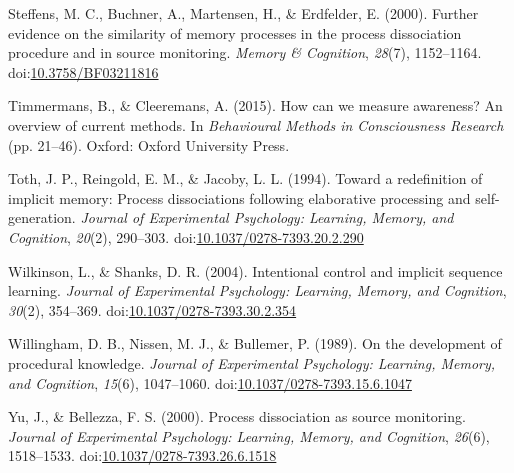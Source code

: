 \documentclass[man]{apa6}
\theoremstyle{definition}
\theoremstyle{definition}
\theoremstyle{definition}
\theoremstyle{remark}
\begin{document}
\hypertarget{ref-steffens_further_2000}{}
Steffens, M. C., Buchner, A., Martensen, H., \& Erdfelder, E. (2000).
Further evidence on the similarity of memory processes in the process
dissociation procedure and in source monitoring. \emph{Memory \&
Cognition}, \emph{28}(7), 1152--1164.
doi:\href{https://doi.org/10.3758/BF03211816}{10.3758/BF03211816}

\hypertarget{ref-timmermans_how_2015}{}
Timmermans, B., \& Cleeremans, A. (2015). How can we measure awareness?
An overview of current methods. In \emph{Behavioural Methods in
Consciousness Research} (pp. 21--46). Oxford: Oxford University Press.

\hypertarget{ref-toth_toward_1994}{}
Toth, J. P., Reingold, E. M., \& Jacoby, L. L. (1994). Toward a
redefinition of implicit memory: Process dissociations following
elaborative processing and self-generation. \emph{Journal of
Experimental Psychology: Learning, Memory, and Cognition}, \emph{20}(2),
290--303.
doi:\href{https://doi.org/10.1037/0278-7393.20.2.290}{10.1037/0278-7393.20.2.290}

\hypertarget{ref-wilkinson_intentional_2004}{}
Wilkinson, L., \& Shanks, D. R. (2004). Intentional control and implicit
sequence learning. \emph{Journal of Experimental Psychology: Learning,
Memory, and Cognition}, \emph{30}(2), 354--369.
doi:\href{https://doi.org/10.1037/0278-7393.30.2.354}{10.1037/0278-7393.30.2.354}

\hypertarget{ref-willingham_development_1989}{}
Willingham, D. B., Nissen, M. J., \& Bullemer, P. (1989). On the
development of procedural knowledge. \emph{Journal of Experimental
Psychology: Learning, Memory, and Cognition}, \emph{15}(6), 1047--1060.
doi:\href{https://doi.org/10.1037/0278-7393.15.6.1047}{10.1037/0278-7393.15.6.1047}

\hypertarget{ref-yu_process_2000}{}
Yu, J., \& Bellezza, F. S. (2000). Process dissociation as source
monitoring. \emph{Journal of Experimental Psychology: Learning, Memory,
and Cognition}, \emph{26}(6), 1518--1533.
doi:\href{https://doi.org/10.1037/0278-7393.26.6.1518}{10.1037/0278-7393.26.6.1518}





  \clearpage
  \makeatletter
  \efloat@restorefloats
  \makeatother
  
\end{document}
